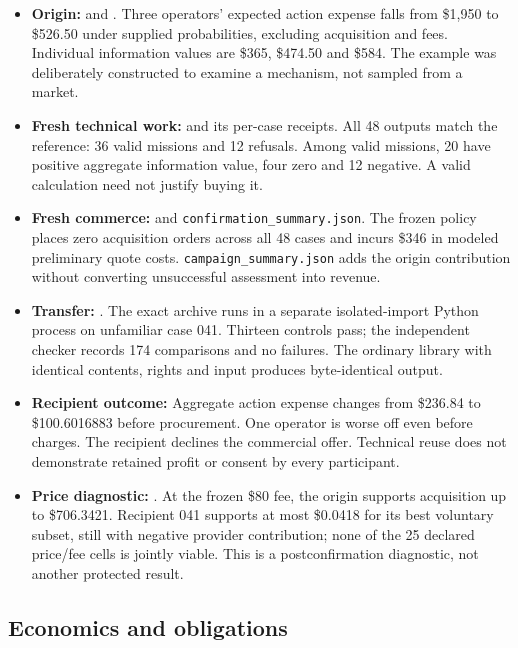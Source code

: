 \documentclass[11pt,letterpaper]{article}
\providecommand{\tightlist}{\setlength{\itemsep}{0pt}\setlength{\parskip}{0pt}}
\begin{document}
\begin{itemize}
\tightlist
\item
  \textbf{Origin:}  and
  . Three operators' expected action expense
  falls from \$1,950 to \$526.50 under supplied probabilities, excluding
  acquisition and fees. Individual information values are \$365,
  \$474.50 and \$584. The example was deliberately constructed to
  examine a mechanism, not sampled from a market.
\item
  \textbf{Fresh technical work:}
   and its per-case
  receipts. All 48 outputs match the reference: 36 valid missions and 12
  refusals. Among valid missions, 20 have positive aggregate information
  value, four zero and 12 negative. A valid calculation need not justify
  buying it.
\item
  \textbf{Fresh commerce:}  and
  \texttt{confirmation\_summary.json}. The frozen policy places zero
  acquisition orders across all 48 cases and incurs \$346 in modeled
  preliminary quote costs. \texttt{campaign\_summary.json} adds the
  origin contribution without converting unsuccessful assessment into
  revenue.
\item
  \textbf{Transfer:}
  . The exact
  archive runs in a separate isolated-import Python process on
  unfamiliar case 041. Thirteen controls pass; the independent checker
  records 174 comparisons and no failures. The ordinary library with
  identical contents, rights and input produces byte-identical output.
\item
  \textbf{Recipient outcome:} Aggregate action expense changes from
  \$236.84 to \$100.6016883 before procurement. One operator is worse
  off even before charges. The recipient declines the commercial offer.
  Technical reuse does not demonstrate retained profit or consent by
  every participant.
\item
  \textbf{Price diagnostic:}
  . At the frozen \$80
  fee, the origin supports acquisition up to \$706.3421. Recipient 041
  supports at most \$0.0418 for its best voluntary subset, still with
  negative provider contribution; none of the 25 declared price/fee
  cells is jointly viable. This is a postconfirmation diagnostic, not
  another protected result.
\end{itemize}

\hypertarget{economics-and-obligations}{%
\subsection{Economics and obligations}\label{economics-and-obligations}}
\end{document}

